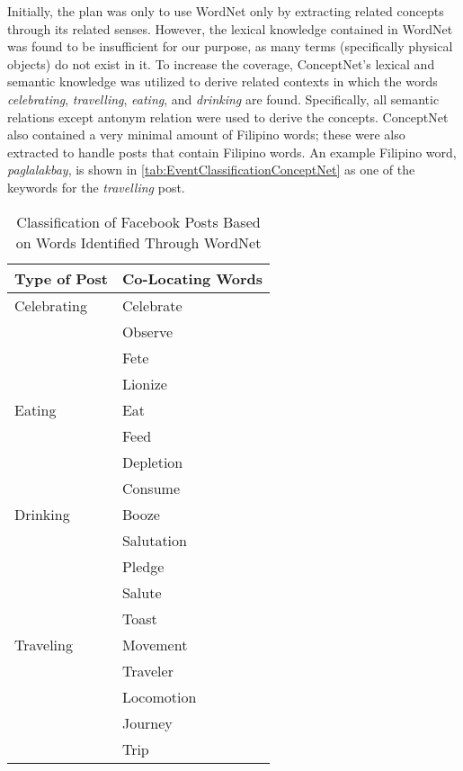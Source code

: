 Initially, the plan was only to use WordNet only by extracting related concepts through its related senses. However, the lexical knowledge contained in WordNet was found to be insufficient for our purpose, as many terms (specifically physical objects) do not exist in it. To increase the coverage, ConceptNet’s lexical and semantic knowledge was utilized to derive related contexts in which the words \textit{celebrating}, \textit{travelling}, \textit{eating}, and \textit{drinking} are found. Specifically, all semantic relations except antonym relation were used to derive the concepts. ConceptNet also contained a very minimal amount of Filipino words; these were also extracted to handle posts that contain Filipino words. An example Filipino word, \textit{paglalakbay}, is shown in \ref{tab:EventClassificationConceptNet} as one of the keywords for the \textit{travelling} post.
\clearpage
\begin{table}[ph!]   %
	\centering
	\caption{Classification of Facebook Posts Based on Words Identified Through WordNet} \vspace{0.25em}
	\begin{tabular}{|p{1.5in}|p{2in}|} \hline
		\centering Type of Post & Co-Locating Words \\ \hline
		Celebrating 
			& Celebrate \\
			& Observe\\
			& Fete\\
			& Lionize
		\\ \hline
		Eating 
			& Eat\\
			& Feed\\
			& Depletion\\
			& Consume 
		 \\ \hline
		Drinking 
			& Booze\\
			& Salutation\\
			& Pledge\\
			& Salute\\
			& Toast
		 \\ \hline
		Traveling
			& Movement\\
			& Traveler\\
			& Locomotion\\
			& Journey\\
			& Trip\\\hline
	\end{tabular}
	\label{tab:EventClassificationWordNet}
\end{table}
\clearpage
